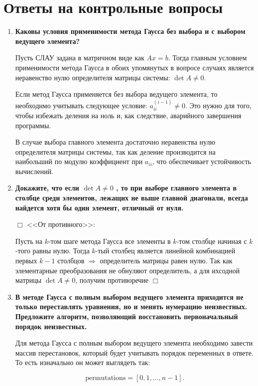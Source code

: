 \documentclass[12pt, a4paper]{article}
\begin{document}
	\section*{Ответы на контрольные вопросы}
	\begin{enumerate}
		\item \textbf{Каковы условия применимости метода Гаусса без выбора и с выбором ведущего элемента?}
		
		Пусть СЛАУ задана в матричном виде как $Ax=b$. Тогда главным условием применимости метода Гаусса в обоих упомянутых в вопросе случаях является неравенство нулю определителя матрицы системы: $\det A\neq0$.
		
		Если метод Гаусса применяется без выбора ведущего элемента, то необходимо учитывать следующее условие: $a_{ii}^{(i-1)}\neq0$. Это нужно для того, чтобы избежать деления на ноль и, как следствие, аварийного завершения программы.
		
		В случае выбора главного элемента достаточно неравенства нулю определителя матрицы системы, так как деление производится на наибольший по модулю коэффициент при $a_{ii}$, что обеспечивает устойчивость вычислений.
		
		\item \textbf{Докажите, что если $\det A \neq 0$ , то при выборе главного элемента в столбце среди элементов, лежащих не выше главной диагонали, всегда найдется хотя бы один элемент, отличный от нуля.}
		
		$\Box$ <<От противного>>:
		
		Пусть на $k$-том шаге метода Гаусса все элементы в $k$-том столбце начиная с $k$-того равны нулю. Тогда $k$-тый столбец является линейной комбинацией первых $k-1$ столбцов $\Rightarrow$ определитель матрицы равен нулю. Так как элементарные преобразования не обнуляют определитель, а для ихсодной матрицы $\det A \neq 0$, получим противоречие $\Box$
		
		\item\textbf{В методе Гаусса с полным выбором ведущего элемента
		приходится не только переставлять уравнения, но и менять нумерацию неизвестных. Предложите алгоритм, позволяющий восстановить первоначальный порядок неизвестных.}
		
		Для метода Гаусса с полным выбором ведущего элемента необходимо завести массив перестановок, который будет учитывать порядок переменных в ответе. То есть изначально он может выглядеть так:
		
		$$
		\text{permutations} = [0,1,\dots,n-1].
		$$
		

\end{enumerate}
\end{document}
